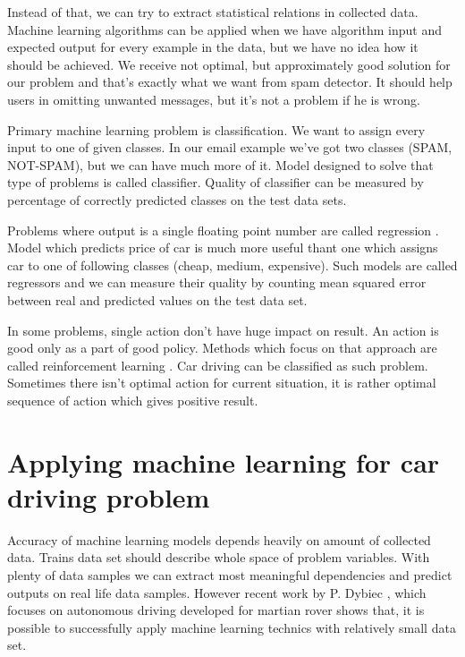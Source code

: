 \documentclass[declaration,shortabstract,english,inz]{iithesis}
\begin{document}
 Instead of that, we can try to extract statistical relations in collected data. Machine learning algorithms can be applied when we have algorithm input and expected output for every example in the data, but we have no idea how it should be achieved. We receive not optimal, but approximately good solution for our problem and that's exactly what we want from spam detector. It should help users in omitting unwanted messages, but it's not a problem if he is wrong.

 Primary machine learning problem is classification\cite{Introduction_ML}. We want to assign every input to one of given classes. In our email example we've got two classes (SPAM, NOT-SPAM), but we can have much more of it. Model designed to solve that type of problems is called classifier. Quality of classifier can be measured by percentage of correctly predicted classes on the test data sets.

 Problems where output is a single floating point number are called regression \cite{Introduction_ML}. Model which predicts price of car is much more useful thant one which assigns car to one of following classes  (cheap, medium, expensive). Such models are called regressors and we can measure their quality by counting mean squared error between real and predicted values on the test data set.

In some problems, single action don't have huge impact on result. An action is good only as a part of good policy. Methods which focus on that approach are called reinforcement learning \cite{Introduction_ML}. Car driving can be classified as such problem. Sometimes there isn't optimal action for current situation, it is rather optimal sequence of action which gives positive result.


\section{Applying machine learning for car driving problem}

Accuracy of machine learning models depends heavily on amount of collected data. Trains data set should describe whole space of problem variables. With plenty of data samples we can extract most meaningful dependencies and predict outputs on real life data samples. However recent work by P. Dybiec \cite[2018]{rover}, which focuses on autonomous driving developed for martian rover shows that, it is possible to successfully apply machine learning technics with relatively small data set. 
  
\end{document}

